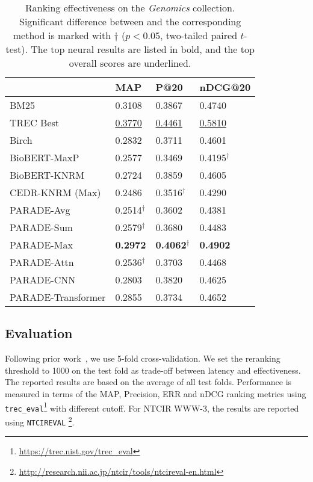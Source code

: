 \begin{table}[tb]
\centering
    \caption{Ranking effectiveness on the {\it Genomics} collection. Significant difference between  and the corresponding method is marked with $\dagger$ ($p < 0.05$, two-tailed paired $t$-test). The top neural results are listed in bold, and the top overall scores are underlined.}
    \label{tab:genomics}
\begin{tabular}{l|lll} \toprule
& MAP & P@20 & nDCG@20  \\ \midrule
BM25                & 0.3108 & 0.3867 & 0.4740 \\
TREC Best           & \underline{0.3770} & \underline{0.4461} & \underline{0.5810} \\ \midrule
Birch               & 0.2832 & 0.3711 & 0.4601 \\
BioBERT-MaxP        & 0.2577 & 0.3469 & 0.4195$^{\dagger}$ \\
BioBERT-KNRM        & 0.2724 & 0.3859 & 0.4605 \\
CEDR-KNRM (Max)     & 0.2486 & 0.3516$^{\dagger}$ & 0.4290 \\
\midrule
PARADE-Avg          & 0.2514$^{\dagger}$ & 0.3602 & 0.4381 \\
PARADE-Sum          & 0.2579$^{\dagger}$ & 0.3680 & 0.4483 \\
PARADE-Max          &\bf0.2972 &\bf0.4062$^{\dagger}$ & \bf 0.4902 \\
PARADE-Attn         & 0.2536$^{\dagger}$ & 0.3703 & 0.4468 \\
PARADE-CNN          & 0.2803 & 0.3820 & 0.4625 \\
PARADE-Transformer  & 0.2855 & 0.3734 & 0.4652 \\ \bottomrule
\end{tabular}
\end{table}


\subsection{Evaluation}
Following prior work~\cite{DBLP:conf/sigir/DaiC19, DBLP:conf/sigir/MacAvaneyYCG19}, we use 5-fold cross-validation.
We set the reranking threshold to 1000 on the test fold as trade-off between latency and effectiveness.
The reported results are based on the average of all test folds.
Performance is measured in terms of the MAP, Precision, ERR and nDCG ranking metrics using \texttt{trec\_eval}\footnote{\url{https://trec.nist.gov/trec_eval}} with different cutoff.
For NTCIR WWW-3, the results are reported using \texttt{NTCIREVAL} \footnote{\url{http://research.nii.ac.jp/ntcir/tools/ntcireval-en.html}}.


